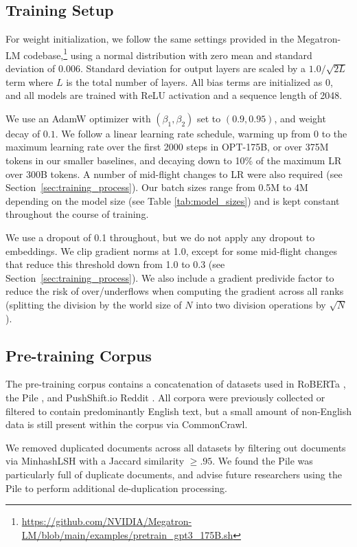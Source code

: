 \subsection{Training Setup}
\label{sec:training_setup}
For weight initialization, we follow the same settings provided in the Megatron-LM codebase,\footnote{\url{https://github.com/NVIDIA/Megatron-LM/blob/main/examples/pretrain_gpt3_175B.sh}} using a normal distribution with zero mean and standard deviation of 0.006.  Standard deviation for output layers are scaled by a $1.0/\sqrt{2 L}$ term where $L$ is the total number of layers. All bias terms are initialized as 0, and all models are trained with ReLU activation and a sequence length of 2048.

We use an AdamW optimizer \cite{AdamW} with $(\beta_1,\beta_2)$ set to $(0.9, 0.95)$, and weight decay of $0.1$.  We follow a linear learning rate schedule, warming up from $0$ to the maximum learning rate over the first 2000 steps in OPT-175B, or over 375M tokens in our smaller baselines, and decaying down to 10\% of the maximum LR over 300B tokens.  A number of mid-flight changes to LR were also required (see Section~\ref{sec:training_process}).  Our batch sizes range from 0.5M to 4M depending on the model size (see Table \ref{tab:model_sizes}) and is kept constant throughout the course of training.

We use a dropout of 0.1 throughout, but we do not apply any dropout to embeddings. We clip gradient norms at 1.0, except for some mid-flight changes that reduce this threshold down from 1.0 to 0.3 (see Section~\ref{sec:training_process}).  We also include a gradient predivide factor to reduce the risk of over/underflows when computing the gradient across all ranks (splitting the division by the world size of $N$ into two division operations by $\sqrt{N}$).

\subsection{Pre-training Corpus}
\label{sec:training_dataset}
The pre-training corpus contains a concatenation of datasets used in RoBERTa \cite{liu2019roberta}, the Pile \cite{thepile}, and PushShift.io Reddit \cite{reddit2020, roller-etal-2021-recipes}. All corpora were previously collected or filtered to contain predominantly English text, but a small amount of non-English data is still present within the corpus via CommonCrawl.

We removed duplicated documents across all datasets by filtering out documents via MinhashLSH \cite{rajaraman2011mining} with a Jaccard similarity $\geq.95$. We found the Pile was particularly full of duplicate documents, and advise future researchers using the Pile to perform additional de-duplication processing.

